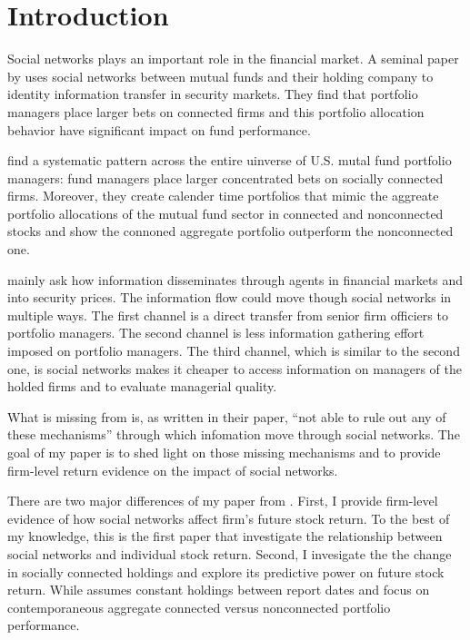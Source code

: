 \documentclass[11pt]{article}
\begin{document}
\section{Introduction}
\begin{doublespace}
Social networks plays an important role in the financial market. A seminal paper by \cite{cohen2008small}
 uses social networks between mutual funds and their holding company to identity information transfer in security markets. They find that portfolio managers place larger bets on connected firms and this portfolio allocation behavior have significant impact on fund performance. 

 \cite{cohen2008small} find a systematic pattern across the entire uinverse of U.S. mutal fund portfolio managers: fund managers place larger concentrated bets on socially connected firms. Moreover, they create calender time portfolios that mimic the aggreate portfolio allocations of the mutual fund sector in connected and nonconnected stocks and show the connoned aggregate portfolio outperform the nonconnected one. 

\cite{cohen2008small} mainly ask how information disseminates through agents in financial markets and into security prices. The information flow could move though social networks in multiple ways. The first channel is a direct transfer from senior firm officiers to portfolio managers. The second channel is less information gathering effort imposed on portfolio managers.  The third channel, which is similar to the second one, is social networks makes it cheaper to access information on managers of the holded firms and to evaluate managerial quality. 

What is missing from \cite{cohen2008small} is, as written in their paper, ``not able to rule out any of these mechanisms'' through which infomation move through social networks. The goal of my paper is to shed light on those missing mechanisms and to provide firm-level return evidence on the impact of social networks. 

There are two major differences of my paper from \cite{cohen2008small}. First, I provide firm-level evidence of how social networks affect firm's future stock return. To the best of my knowledge, this is the first paper that investigate the relationship between social networks and individual stock return. Second, I invesigate the the change in socially connected holdings and explore its predictive power on future stock return. While \cite{cohen2008small} assumes constant holdings between report dates and focus on contemporaneous aggregate connected versus nonconnected portfolio performance. 


\end{doublespace}
\end{document}
